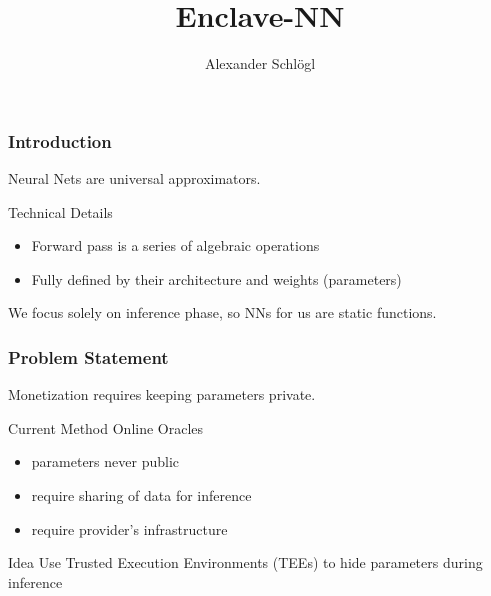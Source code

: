 \documentclass[aspectratio=169,nototalframenumber]{beamer}
\title{Enclave-NN}
\author{Alexander Schl\"ogl}
\begin{document}
\uibktitlepage{}

\begin{frame}[label=basics]
    \frametitle{Introduction}

    Neural Nets are universal approximators.

	\vspace{4ex}

	\begin{block}{Technical Details}
    	\begin{itemize}
        	\item Forward pass is a series of algebraic operations
        	\item Fully defined by their architecture and weights (parameters)
    	\end{itemize}
	\end{block}

	We focus solely on inference phase, so NNs for us are static functions.
\end{frame}

\begin{frame}
    \frametitle{Problem Statement}

	Monetization requires keeping parameters private.
	\vspace{3ex}
	\pause

	\begin{block}{Current Method}
    	Online Oracles
    	\begin{itemize}
        	\item parameters never public
        	\item require sharing of data for inference
        	\item require provider's infrastructure
    	\end{itemize}
	\end{block}

	\pause

	\begin{alertblock}{Idea}
    	Use Trusted Execution Environments (TEEs) to hide parameters during inference
	\end{alertblock}
\end{frame}
\end{document}
